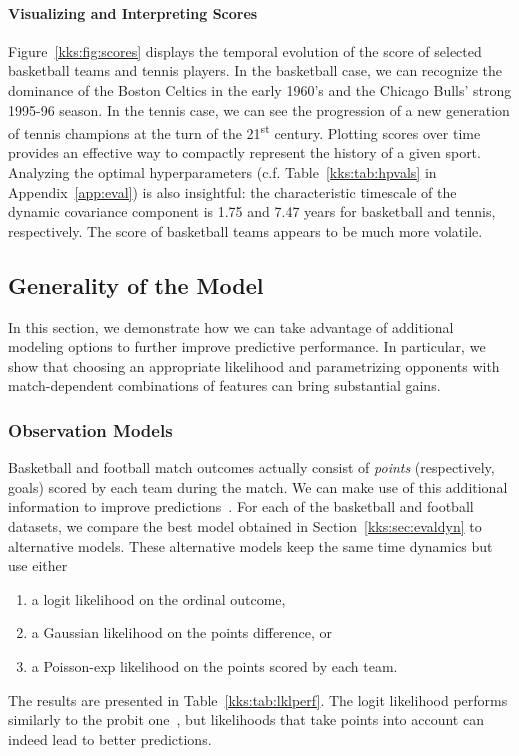 \paragraph{Visualizing and Interpreting Scores}
Figure~\ref{kks:fig:scores} displays the temporal evolution of the score of selected basketball teams and tennis players.
In the basketball case, we can recognize the dominance of the Boston Celtics in the early 1960's and the Chicago Bulls' strong 1995-96 season.
In the tennis case, we can see the progression of a new generation of tennis champions at the turn of the 21\textsuperscript{st} century.
Plotting scores over time provides an effective way to compactly represent the history of a given sport.
Analyzing the optimal hyperparameters (c.f. Table~\ref{kks:tab:hpvals} in Appendix~\ref{app:eval}) is also insightful: the characteristic timescale of the dynamic covariance component is \num{1.75} and \num{7.47} years for basketball and tennis, respectively.
The score of basketball teams appears to be much more volatile.


\subsection{Generality of the Model}
\label{kks:sec:evalgen}

In this section, we demonstrate how we can take advantage of additional modeling options to further improve predictive performance.
In particular, we show that
choosing an appropriate likelihood and
parametrizing opponents with match-dependent combinations of features
can bring substantial gains.


\subsubsection{Observation Models}
Basketball and football match outcomes actually consist of \emph{points} (respectively, goals) scored by each team during the match.
We can make use of this additional information to improve predictions~\citep{maher1982modelling}.
For each of the basketball and football datasets, we compare the best model obtained in Section~\ref{kks:sec:evaldyn} to alternative models.
These alternative models keep the same time dynamics but use either
\begin{enumerate}
	\item a logit likelihood on the ordinal outcome,
	\item a Gaussian likelihood on the points difference, or
	\item a Poisson-exp likelihood on the points scored by each team.
\end{enumerate}
The results are presented in Table~\ref{kks:tab:lklperf}.
The logit likelihood performs similarly to the probit one~\citep{stern1992all}, but likelihoods that take points into account can indeed lead to better predictions.


